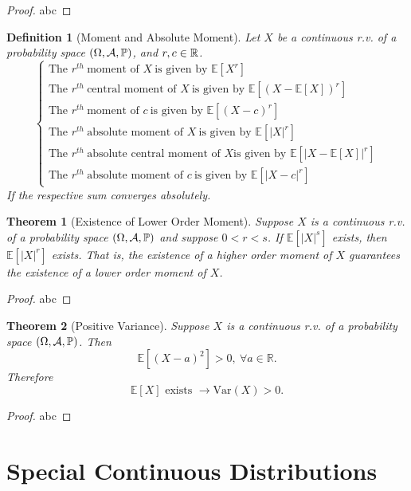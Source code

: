 \documentclass[openany,12pt]{book}
\newtheorem{theorem}{Theorem}[chapter]
\newtheorem{definition}{Definition}[chapter]
\begin{document}
\begin{proof}
  abc
\end{proof}

\begin{definition}[Moment and Absolute Moment]
Let $X$ be a continuous r.v. of a probability space $(\Omega,\mathcal{A},\mathbb{P})$, and $r,c\in\mathbb{R}$.
$$\left\{
\begin{array}{l}
\text{The }r^{th}\ \text{moment of } X\ \text{is given by } \mathbb{E}[X^r]   \\                              
\text{The }r^{th}\ \text{central moment of } X\ \text{is given by } \mathbb{E}[(X-\mathbb{E}[X])^r]\\
\text{The }r^{th}\ \text{moment of } c\ \text{is given by } \mathbb{E}[(X-c)^r]      \\     
\text{The }r^{th}\ \text{absolute moment of } X\ \text{is given by } \mathbb{E}[|X|^r]\\
\text{The }r^{th}\ \text{absolute central moment of } X \text{is given by } \mathbb{E}[|X-\mathbb{E}[X] |^r]  \\
\text{The } r^{th}\ \text{absolute moment of } c\ \text{is given by } \mathbb{E}[|X-c|^r] 
\end{array}
\right.$$
If the respective sum converges absolutely.
\end{definition}

\begin{theorem}[Existence of Lower Order Moment]
Suppose $X$ is a continuous r.v. of a probability space $(\Omega,\mathcal{A},\mathbb{P})$ and suppose $0<r<s$. If $\mathbb{E}[|X|^s]$ exists, then $\mathbb{E}[|X|^r]$ exists. That is, the existence of a higher order moment of $X$ guarantees the existence of a lower order moment of $X$.
\end{theorem}

\begin{proof}
  abc
\end{proof}

\begin{theorem}[Positive Variance]
Suppose $X$ is a continuous r.v. of a probability space $(\Omega,\mathcal{A},\mathbb{P})$. Then
$$
\mathbb{E}\left[\left(X-a\right)^2\right]>0,\ \forall a\in\mathbb{R}.
$$
Therefore
$$
\mathbb{E}[X] \text{ exists }\to   \mathrm{Var}(X)>0.
$$
\end{theorem}

\begin{proof}
  abc
\end{proof}

\chapter{Special Continuous Distributions}
\end{document}
